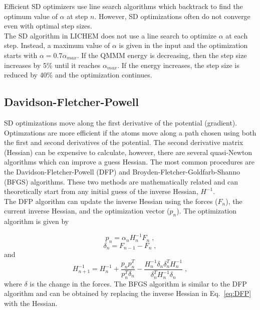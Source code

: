 \documentclass[12pt]{report}
\begin{document}
Efficient SD optimizers use line search algorithms which backtrack to find the
optimum value of $\alpha$ at step $n$. However, SD optimizations often do not
converge even with optimal step sizes. \\

The SD algorithm in LICHEM does not use a line search to optimize $\alpha$ at
each step. Instead, a maximum value of $\alpha$ is given in the input and 
the optimization starts with $\alpha=0.7\alpha_{max}$. If the QMMM energy
is decreasing, then the step size increases by 5\% until it reaches
$\alpha_{max}$. If the energy increases, the step size is reduced by 40\% and
the optimization continues.

\subsection{Davidson-Fletcher-Powell}

SD optimizations move along the first derivative of the potential (gradient).
Optimzations are more efficient if the atoms move along a path chosen using
both the first and second derivatives of the potential. The second derivative
matrix (Hessian) can be expensive to calculate, however, there are several
quasi-Newton algorithms which can improve a guess Hessian. The most common
procedures are the Davidson-Fletcher-Powell (DFP) and
Broyden-Fletcher-Goldfarb-Shanno (BFGS) algorithms. These two methods are
mathematically related and can theoretically start from any initial guess of
the inverse Hessian, $H^{-1}$. \\

The DFP algorithm can update the inverse Hessian using the forces ($F_n$), the
current inverse Hessian, and the optimization vector ($p_n$). The optimization
algorithm is given by

\begin{equation}
 p_n = \alpha_n H_n^{-1} F_n \; ,
\end{equation}
\begin{equation}
 \delta_n = F_{n-1}-F_n \; ,
\end{equation}
and
\begin{equation}
 \label{eq:DFP}
 H_{n+1}^{-1} = H_n^{-1} + \frac{p_n p_n^T}{p_n^T \delta_n} -
 \frac{H_n^{-1} \delta_n \delta_n^T H_n^{-1}}{\delta_n^T H_n^{-1} \delta_n}
 \; ,
\end{equation}
where $\delta$ is the change in the forces. The BFGS algorithm is similar to
the DFP algorithm and can be obtained by replacing the inverse Hessian in
Eq.\ \ref{eq:DFP} with the Hessian. \\
\end{document}
